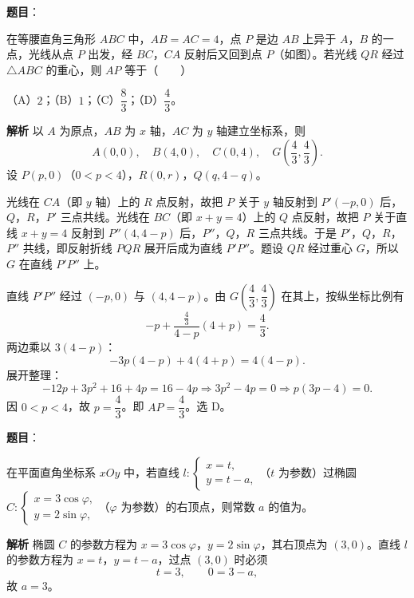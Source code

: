 \begin{answer}

\textbf{题目}：

在等腰直角三角形 $ABC$ 中，$AB=AC=4$，点 $P$ 是边 $AB$ 上异于 $A$，$B$ 的一点，光线从点 $P$ 出发，经 $BC$，$CA$ 反射后又回到点 $P$（如图）。若光线 $QR$ 经过 $\triangle ABC$ 的重心，则 $AP$ 等于\mbox{（　　）}
\nopagebreak[4]
\begin{center}\end{center}
\nopagebreak[4]
（A）$2$；（B）$1$；（C）$\dfrac83$；（D）$\dfrac43$。

\textbf{解析}
以 $A$ 为原点，$AB$ 为 $x$ 轴，$AC$ 为 $y$ 轴建立坐标系，则
\nopagebreak[4]
\[A(0,0),\quad B(4,0),\quad C(0,4),\quad G\left(\frac43,\frac43\right).\]
设 $P(p,0)$（$0<p<4$），$R(0,r)$，$Q(q,4-q)$。

光线在 $CA$（即 $y$ 轴）上的 $R$ 点反射，故把 $P$ 关于 $y$ 轴反射到 $P'(-p,0)$ 后，$Q$，$R$，$P'$ 三点共线。光线在 $BC$（即 $x+y=4$）上的 $Q$ 点反射，故把 $P$ 关于直线 $x+y=4$ 反射到 $P''(4,4-p)$ 后，$P''$，$Q$，$R$ 三点共线。于是 $P'$，$Q$，$R$，$P''$ 共线，即反射折线 $PQR$ 展开后成为直线 $P'P''$。题设 $QR$ 经过重心 $G$，所以 $G$ 在直线 $P'P''$ 上。

直线 $P'P''$ 经过 $(-p,0)$ 与 $(4,4-p)$。由 $G\left(\dfrac43,\dfrac43\right)$ 在其上，按纵坐标比例有
\nopagebreak[4]
\[-p+\frac{\frac43}{4-p}(4+p)=\frac43.\]
两边乘以 $3(4-p)$：
\nopagebreak[4]
\[-3p(4-p)+4(4+p)=4(4-p).\]
展开整理：
\nopagebreak[4]
\[-12p+3p^2+16+4p=16-4p
\Longrightarrow 3p^2-4p=0
\Longrightarrow p(3p-4)=0.\]
因 $0<p<4$，故 $p=\dfrac43$。即 $AP=\dfrac43$。选 D。


\end{answer}
\begin{answer}

\textbf{题目}：

在平面直角坐标系 $xOy$ 中，若直线 $l:\begin{cases}x=t,\\y=t-a,\end{cases}$（$t$ 为参数）过椭圆 $C:\begin{cases}x=3\cos\varphi,\\y=2\sin\varphi,\end{cases}$（$\varphi$ 为参数）的右顶点，则常数 $a$ 的值为\gkblank{}。

\textbf{解析}
椭圆 $C$ 的参数方程为 $x=3\cos\varphi$，$y=2\sin\varphi$，其右顶点为 $(3,0)$。直线 $l$ 的参数方程为 $x=t$，$y=t-a$，过点 $(3,0)$ 时必须
\nopagebreak[4]
\[t=3,\qquad 0=3-a,\]
故 $a=3$。


\end{answer}
